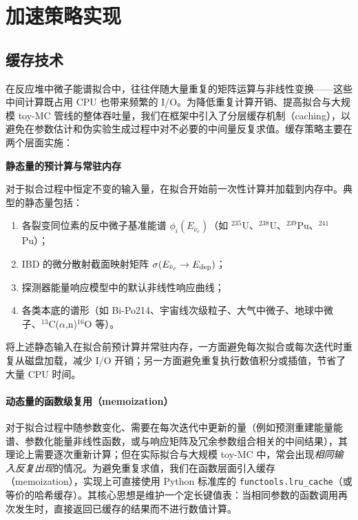 \section{加速策略实现}
\label{sec:techniques}

\subsection{缓存技术}
\label{sec:caching}
在反应堆中微子能谱拟合中，往往伴随大量重复的矩阵运算与非线性变换——这些中间计算既占用 CPU 也带来频繁的 I/O。为降低重复计算开销、提高拟合与大规模 toy-MC 管线的整体吞吐量，我们在框架中引入了分层缓存机制（caching），以避免在参数估计和伪实验生成过程中对不必要的中间量反复求值。缓存策略主要在两个层面实施：

\textbf{静态量的预计算与常驻内存}

对于拟合过程中恒定不变的输入量，在拟合开始前一次性计算并加载到内存中。典型的静态量包括：

\begin{enumerate}
    \item 各裂变同位素的反中微子基准能谱 $\phi_i(E_{\bar{\nu}_e})$（如 ${}^{235}$U、${}^{238}$U、${}^{239}$Pu、${}^{241}$Pu）；
    \item IBD 的微分散射截面映射矩阵 $\sigma(E_{\bar{\nu}_e}\to E_{\rm dep})$；
    \item 探测器能量响应模型中的默认非线性响应曲线；
    \item 各类本底的谱形（如 Bi-Po214、宇宙线次级粒子、大气中微子、地球中微子、$^{13}$C($\alpha$,n)$^{16}$O 等）。
\end{enumerate}

将上述静态输入在拟合前预计算并常驻内存，一方面避免每次拟合或每次迭代时重复从磁盘加载，减少 I/O 开销；另一方面避免重复执行数值积分或插值，节省了大量 CPU 时间。

\paragraph{动态量的函数级复用（memoization）}
对于拟合过程中随参数变化、需要在每次迭代中更新的量（例如预测重建能量能谱、参数化能量非线性函数，或与响应矩阵及冗余参数组合相关的中间结果），其理论上需要逐次重新计算；但在实际拟合与大规模 toy-MC 中，常会出现\emph{相同输入反复出现}的情况。为避免重复求值，我们在函数层面引入缓存（memoization），实现上可直接使用 Python 标准库的 \texttt{functools.lru\_cache}（或等价的哈希缓存）。其核心思想是维护一个定长键值表：当相同参数的函数调用再次发生时，直接返回已缓存的结果而不进行数值计算。

